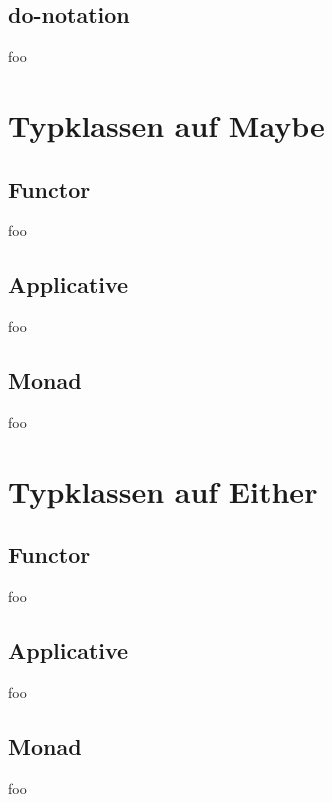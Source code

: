 \documentclass{beamer}
\begin{document}
\subsection{do-notation}
\begin{frame}
 foo
\end{frame}

\section{Typklassen auf Maybe}
\subsection{Functor}
\begin{frame}
 foo
\end{frame}

\subsection{Applicative}
\begin{frame}
 foo
\end{frame}

\subsection{Monad}
\begin{frame}
 foo
\end{frame}

\section{Typklassen auf Either}
\subsection{Functor}
\begin{frame}
 foo
\end{frame}

\subsection{Applicative}
\begin{frame}
 foo
\end{frame}

\subsection{Monad}
\begin{frame}
 foo
\end{frame}
\end{document}
